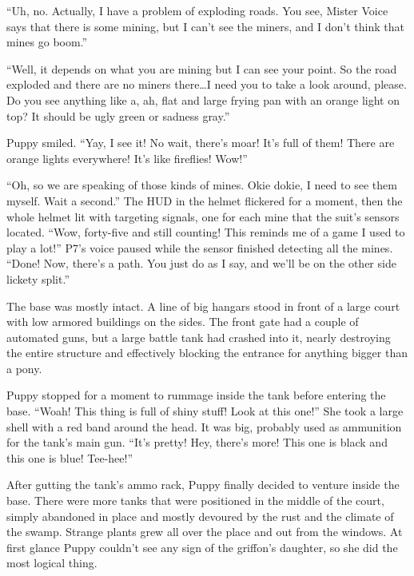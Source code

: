 ``Uh, no. Actually, I have a problem of exploding roads. You see, Mister Voice says that there is some mining, but I can't see the miners, and I don't think that mines go boom.''

``Well, it depends on what you are mining but I can see your point. So the road exploded and there are no miners there\dots I need you to take a look around, please. Do you see anything like a, ah, flat and large frying pan with an orange light on top? It should be ugly green or sadness gray.''

Puppy smiled. ``Yay, I see it! No wait, there's moar! It's full of them! There are orange lights everywhere! It's like fireflies! Wow!''

``Oh, so we are speaking of those kinds of mines. Okie dokie, I need to see them myself. Wait a second.'' The HUD in the helmet flickered for a moment, then the whole helmet lit with targeting signals, one for each mine that the suit's sensors located. ``Wow, forty-five and still counting! This reminds me of a game I used to play a lot!'' P7's voice paused while the sensor finished detecting all the mines. ``Done! Now, there's a path. You just do as I say, and we'll be on the other side lickety split.''


\horizonline


The base was mostly intact. A line of big hangars stood in front of a large court with low armored buildings on the sides. The front gate had a couple of automated guns, but a large battle tank had crashed into it, nearly destroying the entire structure and effectively blocking the entrance for anything bigger than a pony.

Puppy stopped for a moment to rummage inside the tank before entering the base. ``Woah! This thing is full of shiny stuff! Look at this one!'' She took a large shell with a red band around the head. It was big, probably used as ammunition for the tank's main gun. ``It's pretty! Hey, there's more! This one is black and this one is blue! Tee-hee!''

After gutting the tank's ammo rack, Puppy finally decided to venture inside the base. There were more tanks that were positioned in the middle of the court, simply abandoned in place and mostly devoured by the rust and the climate of the swamp. Strange plants grew all over the place and out from the windows. At first glance Puppy couldn't see any sign of the griffon's daughter, so she did the most logical thing.

